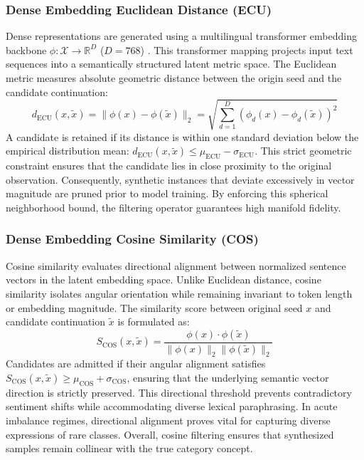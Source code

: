 \documentclass{ieeeaccess}
\begin{document}
\subsubsection{Dense Embedding Euclidean Distance (ECU)}
Dense representations are generated using a multilingual transformer embedding backbone $\phi: \mathcal{X} \to \mathbb{R}^D$ ($D=768$) \cite{refai2023data}. This transformer mapping projects input text sequences into a semantically structured latent metric space. The Euclidean metric measures absolute geometric distance between the origin seed and the candidate continuation:
\begin{equation}
    d_{\text{ECU}}(x, \tilde{x}) = \|\phi(x) - \phi(\tilde{x})\|_2 = \sqrt{\sum_{d=1}^D (\phi_d(x) - \phi_d(\tilde{x}))^2}
\end{equation}
A candidate is retained if its distance is within one standard deviation below the empirical distribution mean: $d_{\text{ECU}}(x, \tilde{x}) \le \mu_{\text{ECU}} - \sigma_{\text{ECU}}$. This strict geometric constraint ensures that the candidate lies in close proximity to the original observation. Consequently, synthetic instances that deviate excessively in vector magnitude are pruned prior to model training. By enforcing this spherical neighborhood bound, the filtering operator guarantees high manifold fidelity.

\subsubsection{Dense Embedding Cosine Similarity (COS)}
Cosine similarity evaluates directional alignment between normalized sentence vectors in the latent embedding space. Unlike Euclidean distance, cosine similarity isolates angular orientation while remaining invariant to token length or embedding magnitude. The similarity score between original seed $x$ and candidate continuation $\tilde{x}$ is formulated as:
\begin{equation}
    S_{\text{COS}}(x, \tilde{x}) = \frac{\phi(x) \cdot \phi(\tilde{x})}{\|\phi(x)\|_2 \|\phi(\tilde{x})\|_2}
\end{equation}
Candidates are admitted if their angular alignment satisfies $S_{\text{COS}}(x, \tilde{x}) \ge \mu_{\text{COS}} + \sigma_{\text{COS}}$, ensuring that the underlying semantic vector direction is strictly preserved. This directional threshold prevents contradictory sentiment shifts while accommodating diverse lexical paraphrasing. In acute imbalance regimes, directional alignment proves vital for capturing diverse expressions of rare classes. Overall, cosine filtering ensures that synthesized samples remain collinear with the true category concept.
\end{document}

